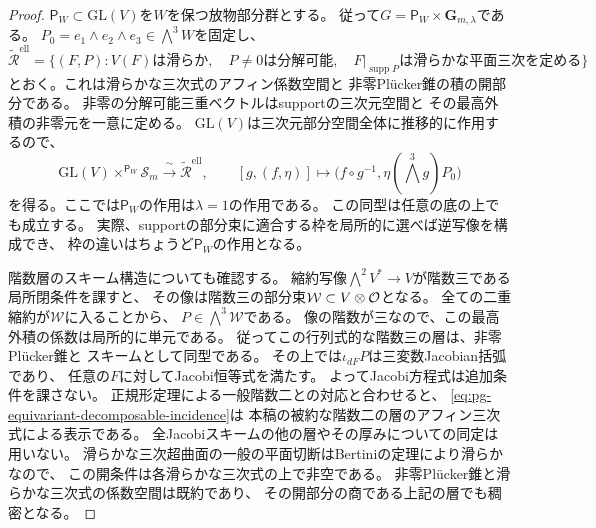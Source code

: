 \begin{proof}
$\mathsf P_W\subset\mathrm{GL}(V)$を$W$を保つ放物部分群とする。
従って$G=\mathsf P_W\times\mathbf G_{m,\lambda}$である。
$P_0=e_1\wedge e_2\wedge e_3\in\bigwedge^3W$を固定し、
\begin{equation}
 \widetilde{\mathscr R}^{\mathrm{ell}}
 =\{(F,P):V(F)\text{は滑らか},\quad
 P\ne0\text{は分解可能},\quad
 F|_{\operatorname{supp}P}\text{は滑らかな平面三次を定める}\}
 \label{eq:pg-equivariant-decomposable-incidence}
\end{equation}
とおく。これは滑らかな三次式のアフィン係数空間と
非零Pl\"ucker錐の積の開部分である。
非零の分解可能三重ベクトルはsupportの三次元空間と
その最高外積の非零元を一意に定める。
$\mathrm{GL}(V)$は三次元部分空間全体に推移的に作用するので、
\begin{equation}
 \mathrm{GL}(V)\times^{\mathsf P_W}\mathscr S_m
 \xrightarrow{\ \sim\ }\widetilde{\mathscr R}^{\mathrm{ell}},\qquad
 [g,(f,\eta)]\longmapsto
 \bigl(f\circ g^{-1},\eta(\bigwedge^3g)P_0\bigr)
 \label{eq:pg-equivariant-associated-incidence}
\end{equation}
を得る。ここでは$\mathsf P_W$の作用は$\lambda=1$の作用である。
この同型は任意の底の上でも成立する。
実際、supportの部分束に適合する枠を局所的に選べば逆写像を構成でき、
枠の違いはちょうど$\mathsf P_W$の作用となる。

階数層のスキーム構造についても確認する。
縮約写像$\bigwedge^2V^*\to V$が階数三である局所閉条件を課すと、
その像は階数三の部分束$\mathcal W\subset V\otimes\mathcal O$となる。
全ての二重縮約が$\mathcal W$に入ることから、
$P\in\bigwedge^3\mathcal W$である。
像の階数が三なので、この最高外積の係数は局所的に単元である。
従ってこの行列式的な階数三の層は、非零Pl\"ucker錐と
スキームとして同型である。
その上では$\iota_{dF}P$は三変数Jacobian括弧であり、
任意の$F$に対してJacobi恒等式を満たす。
よってJacobi方程式は追加条件を課さない。
正規形定理による一般階数二との対応と合わせると、
\eqref{eq:pg-equivariant-decomposable-incidence}は
本稿の被約な階数二の層のアフィン三次式による表示である。
全Jacobiスキームの他の層やその厚みについての同定は用いない。
滑らかな三次超曲面の一般の平面切断はBertiniの定理により滑らかなので、
この開条件は各滑らかな三次式の上で非空である。
非零Pl\"ucker錐と滑らかな三次式の係数空間は既約であり、
その開部分の商である上記の層でも稠密となる。


\end{proof}
